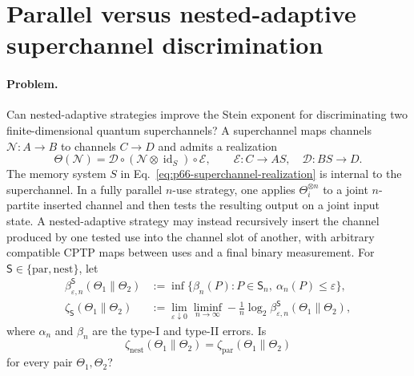 \section{Parallel versus nested-adaptive superchannel discrimination}
\label{sec:op_a4600b38b94042a8}

\paragraph{Problem.}
Can nested-adaptive strategies improve the Stein exponent for discriminating
two finite-dimensional quantum superchannels?  A superchannel maps channels
$\mathcal N:A\to B$ to channels $C\to D$ and admits a realization
\begin{equation}
  \Theta(\mathcal N)
  =\mathcal D\circ(\mathcal N\otimes\operatorname{id}_S)\circ\mathcal E,
  \qquad
  \mathcal E:C\to A S,
  \quad \mathcal D:B S\to D.
  \label{eq:p66-superchannel-realization}
\end{equation}
The memory system $S$ in Eq.~\eqref{eq:p66-superchannel-realization} is
internal to the superchannel.  In a fully parallel $n$-use strategy, one applies
$\Theta_i^{\otimes n}$ to a joint $n$-partite inserted channel and then tests
the resulting output on a joint input state.  A nested-adaptive strategy may
instead recursively insert the channel produced by one tested use into the
channel slot of another, with arbitrary compatible CPTP maps between uses and
a final binary measurement.  For
$\mathsf S\in\{\mathrm{par},\mathrm{nest}\}$, let
\begin{equation}
  \begin{aligned}
  \beta_{\varepsilon,n}^{\mathsf S}(\Theta_1\|\Theta_2)
    &:=\inf\{\beta_n(P):P\in\mathsf S_n,\ \alpha_n(P)\leq\varepsilon\},\\
  \zeta_{\mathsf S}(\Theta_1\|\Theta_2)
    &:=\lim_{\varepsilon\downarrow0}\liminf_{n\to\infty}
      -\frac1n\log_2
      \beta_{\varepsilon,n}^{\mathsf S}(\Theta_1\|\Theta_2),
  \end{aligned}
  \label{eq:p66-stein-exponents}
\end{equation}
where $\alpha_n$ and $\beta_n$ are the type-I and type-II errors.  Is
\begin{equation}
  \zeta_{\mathrm{nest}}(\Theta_1\|\Theta_2)
  =\zeta_{\mathrm{par}}(\Theta_1\|\Theta_2)
  \label{eq:p66-nested-parallel-equality}
\end{equation}
for every pair $\Theta_1,\Theta_2$?

